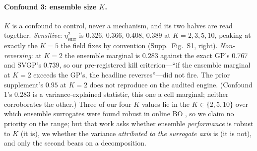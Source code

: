 \documentclass[letterpaper]{article} %
\theoremstyle{plain}
\newcommand{\mdemph}[1]{\emph{#1}}
\begin{document}
\paragraph{Confound 3: ensemble size $K$.} $K$ is a confound to control, never a mechanism, and its two halves are read together. \mdemph{Sensitive}: $\eta^2_{\text{surr}}$ is $0.326$, $0.366$, $0.408$, $0.389$ at $K = 2,3,5,10$, peaking at exactly the $K{=}5$ the field fixes by convention \citep{lakshminarayanan2017ensembles} (Supp.\ Fig.\ S1, right). \mdemph{Non-reversing}: at $K{=}2$ the ensemble marginal is $0.283$ against the exact GP's $0.767$ and SVGP's $0.739$, so our pre-registered kill criterion---``if the ensemble marginal at $K{=}2$ exceeds the GP's, the headline reverses''---did not fire. The prior supplement's $0.95$ at $K{=}2$ does not reproduce on the audited engine. (Confound 1's $0.283$ is a variance-explained statistic, this one a cell marginal; neither corroborates the other.) Three of our four $K$ values lie in the $K\in\{2,5,10\}$ over which ensemble surrogates were found robust in online BO \citep{li2024bnnsurrogates}, so we claim no priority on the range; but that work asks whether ensemble \mdemph{performance} is robust to $K$ (it is), we whether the variance \mdemph{attributed to the surrogate axis} is (it is not), and only the second bears on a decomposition.
\end{document}
